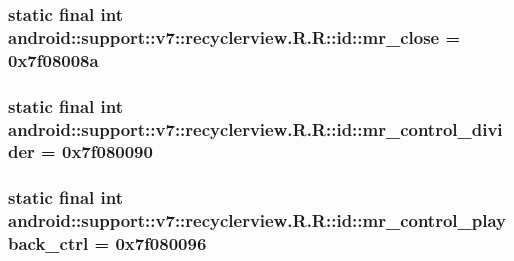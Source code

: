\hypertarget{classandroid_1_1support_1_1v7_1_1recyclerview_1_1_r_1_1id_41a554ae44e769870cd71875d882b352}{
\subsubsection[{mr\_\-close}]{\setlength{\rightskip}{0pt plus 5cm}static final int android::support::v7::recyclerview.R.R::id::mr\_\-close = 0x7f08008a}}
\label{classandroid_1_1support_1_1v7_1_1recyclerview_1_1_r_1_1id_41a554ae44e769870cd71875d882b352}


\hypertarget{classandroid_1_1support_1_1v7_1_1recyclerview_1_1_r_1_1id_468e423ad971a7f3b0346865301e2fec}{
\subsubsection[{mr\_\-control\_\-divider}]{\setlength{\rightskip}{0pt plus 5cm}static final int android::support::v7::recyclerview.R.R::id::mr\_\-control\_\-divider = 0x7f080090}}
\label{classandroid_1_1support_1_1v7_1_1recyclerview_1_1_r_1_1id_468e423ad971a7f3b0346865301e2fec}


\hypertarget{classandroid_1_1support_1_1v7_1_1recyclerview_1_1_r_1_1id_b4c0370b839787d47d1463f80be35ee9}{
\subsubsection[{mr\_\-control\_\-playback\_\-ctrl}]{\setlength{\rightskip}{0pt plus 5cm}static final int android::support::v7::recyclerview.R.R::id::mr\_\-control\_\-playback\_\-ctrl = 0x7f080096}}
\label{classandroid_1_1support_1_1v7_1_1recyclerview_1_1_r_1_1id_b4c0370b839787d47d1463f80be35ee9}


